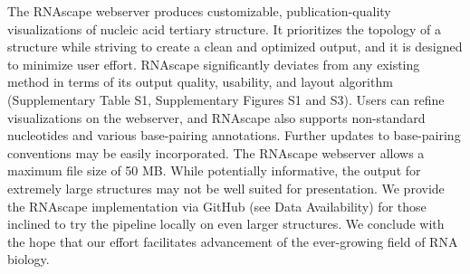 The RNAscape webserver produces customizable, publication-quality visualizations of nucleic acid tertiary structure. It prioritizes the topology of a structure while striving to create a clean and optimized output, and it is designed to minimize user effort. RNAscape significantly deviates from any existing method in terms of its output quality, usability, and layout algorithm (Supplementary Table S1, Supplementary Figures S1 and S3). Users can refine visualizations on the webserver, and RNAscape also supports non-standard nucleotides and various base-pairing annotations. Further updates to base-pairing conventions may be easily incorporated. The RNAscape webserver allows a maximum file size of 50 MB. While potentially informative, the output for extremely large structures may not be well suited for presentation. We provide the RNAscape implementation via GitHub (see Data Availability) for those inclined to try the pipeline locally on even larger structures. We conclude with the hope that our effort facilitates advancement of the ever-growing field of RNA biology.
